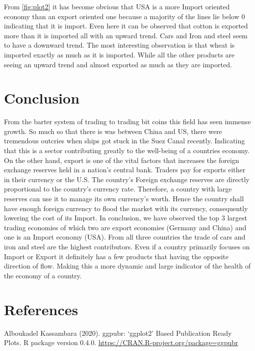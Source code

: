 \documentclass[11pt,a4paper,]{article}
\begin{document}
From \ref{fig:plot2} it has become obvious that USA is a more Import oriented economy than an export oriented one because a majority of the lines lie below 0 indicating that it is import. Even here it can be observed that cotton is exported more than it is imported all with an upward trend. Cars and Iron and steel seem to have a downward trend. The most interesting observation is that wheat is imported exactly as much as it is imported. While all the other products are seeing an upward trend and almost exported as much as they are imported.

\section*{Conclusion}

From the barter system of trading to trading bit coins this field has seen immense growth. So much so that there is was between China and US, there were tremendous outcries when ships got stuck in the Suez Canal recently. Indicating that this is a sector contributing greatly to the well-being of a countries economy.\\
On the other hand, export is one of the vital factors that increases the foreign exchange reserves held in a nation's central bank. Traders pay for exports either in their currency or the U.S. The country's Foreign exchange reserves are directly proportional to the country's currency rate. Therefore, a country with large reserves can use it to manage its own currency's worth. Hence the country shall have enough foreign currency to flood the market with its currency, consequently lowering the cost of its Import.
In conclusion, we have observed the top 3 largest trading economies of which two are export economies (Germany and China) and one is an Import economy (USA). From all three countries the trade of cars and iron and steel are the highest contributors. Even if a country primarily focuses on Import or Export it definitely has a few products that having the opposite direction of flow. Making this a more dynamic and large indicator of the health of the economy of a country.

\section*{References}

Alboukadel Kassambara (2020). ggpubr: `ggplot2' Based Publication Ready Plots. R
package version 0.4.0. \url{https://CRAN.R-project.org/package=ggpubr}
\end{document}

